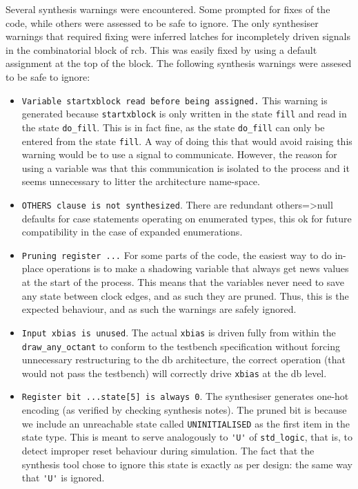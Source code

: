 \documentclass[]{article}
\begin{document}
Several synthesis warnings were encountered. Some prompted for fixes of the code, while others were assessed to be safe to ignore. The only synthesiser warnings that required fixing were inferred latches for incompletely driven signals in the combinatorial block of rcb. This was easily fixed by using a default assignment at the top of the block. The following synthesis warnings were assesed to be safe to ignore:
\begin{itemize}
	\item \verb"Variable startxblock read before being assigned." This warning is generated because \verb"startxblock" is only written in the state \verb"fill" and read in the state \verb"do_fill". This is in fact fine, as the state \verb"do_fill" can only be entered from the state \verb"fill". A way of doing this that would avoid raising this warning would be to use a signal to communicate. However, the reason for using a variable was that this communication is isolated to the process and it seems unnecessary to litter the architecture name-space.
	\item \verb"OTHERS clause is not synthesized". There are redundant others=>null defaults for case statements operating on enumerated types, this ok for future compatibility in the case of expanded enumerations.
	\item \verb"Pruning register ..." For some parts of the code, the easiest way to do in-place operations is to make a shadowing variable that always get news values at the start of the process. This means that the variables never need to save any state between clock edges, and as such they are pruned. Thus, this is the expected behaviour, and as such the warnings are safely ignored.
	\item \verb"Input xbias is unused". The actual \verb"xbias" is driven fully from within the \verb"draw_any_octant" to conform to the testbench specification without forcing unnecessary restructuring to the db architecture, the correct operation (that would not pass the testbench) will correctly drive \verb"xbias"  at the db level.
	\item \verb"Register bit ...state[5] is always 0". The synthesiser generates one-hot encoding (as verified by checking synthesis notes). The pruned bit is because we include an unreachable state called \verb"UNINITIALISED" as the first item in the state type. This is meant to serve analogously to \verb"'U'" of \verb"std_logic", that is, to detect improper reset behaviour during simulation. The fact that the synthesis tool chose to ignore this state is exactly as per design: the same way that \verb"'U'" is ignored.
\end{itemize}
\end{document}
